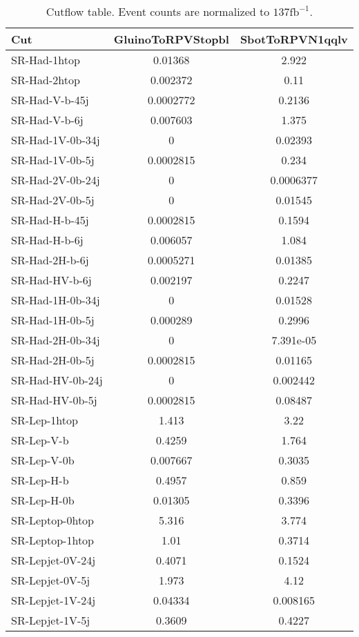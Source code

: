 \begin{sidewaystable}[p]
\centering
\fontsize{7 pt}{1 em}
\selectfont
\caption{Cutflow table. Event counts are normalized to $137\textrm{fb}^{-1}$. }
\begin{tabular}{| l || c | c |}
\hline
Cut & GluinoToRPVStopbl & SbotToRPVN1qqlv \\ \hline
SR-Had-1htop & 0.01368 & 2.922 \\ 
\hline
SR-Had-2htop & 0.002372 & 0.11 \\ 
\hline
SR-Had-V-b-45j & 0.0002772 & 0.2136 \\ 
\hline
SR-Had-V-b-6j & 0.007603 & 1.375 \\ 
\hline
SR-Had-1V-0b-34j & 0 & 0.02393 \\ 
\hline
SR-Had-1V-0b-5j & 0.0002815 & 0.234 \\ 
\hline
SR-Had-2V-0b-24j & 0 & 0.0006377 \\ 
\hline
SR-Had-2V-0b-5j & 0 & 0.01545 \\ 
\hline
SR-Had-H-b-45j & 0.0002815 & 0.1594 \\ 
\hline
SR-Had-H-b-6j & 0.006057 & 1.084 \\ 
\hline
SR-Had-2H-b-6j & 0.0005271 & 0.01385 \\ 
\hline
SR-Had-HV-b-6j & 0.002197 & 0.2247 \\ 
\hline
SR-Had-1H-0b-34j & 0 & 0.01528 \\ 
\hline
SR-Had-1H-0b-5j & 0.000289 & 0.2996 \\ 
\hline
SR-Had-2H-0b-34j & 0 & 7.391e-05 \\ 
\hline
SR-Had-2H-0b-5j & 0.0002815 & 0.01165 \\ 
\hline
SR-Had-HV-0b-24j & 0 & 0.002442 \\ 
\hline
SR-Had-HV-0b-5j & 0.0002815 & 0.08487 \\ 
\hline
SR-Lep-1htop & 1.413 & 3.22 \\ 
\hline
SR-Lep-V-b & 0.4259 & 1.764 \\ 
\hline
SR-Lep-V-0b & 0.007667 & 0.3035 \\ 
\hline
SR-Lep-H-b & 0.4957 & 0.859 \\ 
\hline
SR-Lep-H-0b & 0.01305 & 0.3396 \\ 
\hline
SR-Leptop-0htop & 5.316 & 3.774 \\ 
\hline
SR-Leptop-1htop & 1.01 & 0.3714 \\ 
\hline
SR-Lepjet-0V-24j & 0.4071 & 0.1524 \\ 
\hline
SR-Lepjet-0V-5j & 1.973 & 4.12 \\ 
\hline
SR-Lepjet-1V-24j & 0.04334 & 0.008165 \\ 
\hline
SR-Lepjet-1V-5j & 0.3609 & 0.4227 \\ 
\hline
\end{tabular}
\label{tab:cutflow}
\end{sidewaystable}
